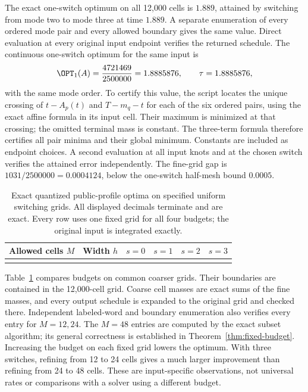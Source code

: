 The exact one-switch optimum on all 12,000 cells is $1.889$, attained by
switching from mode two to mode three at time $1.889$. A separate enumeration
of every ordered mode pair and every allowed boundary gives the same value.
Direct evaluation at every original input endpoint verifies the returned
schedule. The continuous one-switch optimum for the same input is
\begin{equation}\label{eq:public-continuous}
 \OPT_1(A)=\frac{4721469}{2500000}=1.8885876,
 \qquad \tau=1.8885876,
\end{equation}
with the same mode order. To certify this value, the script locates the unique
crossing of $t-A_p(t)$ and $T-m_q-t$ for each of the six ordered pairs,
using the exact affine formula in its input cell. Their maximum is minimized
at that crossing; the omitted terminal mass is constant. The three-term
formula therefore certifies all pair minima and their global minimum.
Constants are included as endpoint choices. A second evaluation at all input
knots and at the chosen switch verifies the attained error independently.
The fine-grid gap is $1031/2500000=0.0004124$, below the one-switch half-mesh
bound $0.0005$.

\begin{table}[tb]
\centering\small
\caption{Exact quantized public-profile optima on specified uniform switching
grids. All displayed decimals terminate and are exact. Every row uses one
fixed grid for all four budgets; the original input is integrated exactly.}
\label{tab:public-profile}
\begin{tabular}{@{}rrrrrr@{}}
\toprule
Allowed cells $M$ & Width $h$ & $s=0$ & $s=1$ & $s=2$ & $s=3$\\
\midrule
\\
\bottomrule
\end{tabular}
\end{table}

Table~\ref{tab:public-profile} compares budgets on common coarser grids. Their
boundaries are contained in the 12,000-cell grid. Coarse cell masses are exact
sums of the fine masses, and every output schedule is expanded to the original
grid and checked there. Independent labeled-word and boundary enumeration
also verifies every entry for $M=12,24$. The $M=48$ entries are computed by the
exact subset algorithm; its general correctness is established in
Theorem~\ref{thm:fixed-budget}. Increasing the budget on each fixed grid lowers
the optimum. With three switches, refining from 12 to 24 cells gives a much
larger improvement than refining from 24 to 48 cells. These are input-specific
observations, not universal rates or comparisons with a solver using a
different budget.

